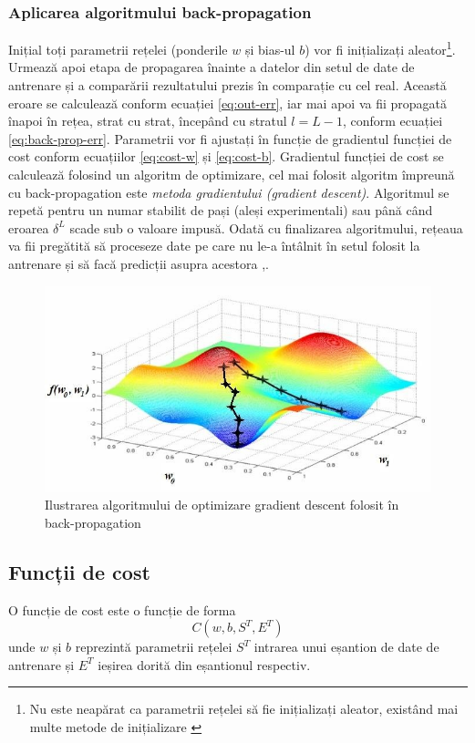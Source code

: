 \subsubsection*{Aplicarea algoritmului back-propagation}
Inițial toți parametrii rețelei (ponderile $w$ și bias-ul $b$) vor fi inițializați aleator\footnote{Nu este neapărat ca parametrii rețelei să fie inițializați aleator, existând mai multe metode de inițializare \cite{online:weight-init-cnn}}. Urmează apoi etapa de propagarea înainte a datelor din setul de date de antrenare și a comparării rezultatului prezis în comparație cu cel real. Această eroare se calculează conform ecuației \eqref{eq:out-err}, iar mai apoi va fii propagată înapoi în rețea, strat cu strat, începând cu stratul $l = L-1$, conform ecuației \eqref{eq:back-prop-err}. Parametrii vor fi ajustați în funcție de gradientul funcției de cost conform ecuațiilor \eqref{eq:cost-w} și \eqref{eq:cost-b}. Gradientul funcției de cost se calculează folosind un algoritm de optimizare, cel mai folosit algoritm împreună cu back-propagation este \textit{metoda gradientului (gradient descent)}. Algoritmul se repetă pentru un numar stabilit de pași (aleși experimentali) sau până când eroarea $\delta^L$ scade sub o valoare impusă. Odată cu finalizarea algoritmului, rețeaua va fii pregătită să proceseze date pe care nu le-a întâlnit în setul folosit la antrenare și să facă predicții asupra acestora \cite{neuralnetbook:2015},\cite{vrejoiu:2019}.
\begin{figure}[ht]
\centering
\includegraphics[width=12cm, keepaspectratio]{fig/cap2/grad-desc.jpg}
\caption{Ilustrarea algoritmului de optimizare gradient descent folosit în back-propagation \cite{vrejoiu:2019}}
\end{figure}

\subsection{Funcții de cost}\label{subsec:f-cost}
O funcție de cost este o funcție de forma \cite{neuralnetbook:2015}
\begin{equation}
C(w,b,S^T,E^T)
\label{eq:cost-form}
\end{equation}
unde $w$ și $b$ reprezintă parametrii rețelei $S^T$ intrarea unui eșantion de date de antrenare și $E^T$ ieșirea dorită din eșantionul respectiv.

